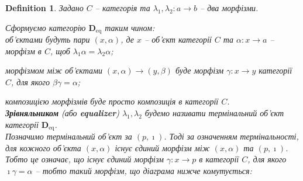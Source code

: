 \documentclass[a4paper, 10pt]{article}
\theoremstyle{theoremdd}
\newtheorem{definition}[theorem]{Definition}
\begin{document}
\begin{definition}
Задано $C$ -- категорія та $\lambda_1,\lambda_2 \colon a \to b$ -- два морфізми.
\begin{figure}[H]
\centering
{}
\end{figure}
\noindent
Сформуємо категорію $\textbf{D}_{\text{eq}}$ таким чином:\\
об'єктами будуть пари $(x,\alpha)$, де $x$ -- об'єкт категорії $C$ та $\alpha \colon x \to a$ -- морфізм в $C$, щоб $\lambda_1 \alpha = \lambda_2 \alpha$;
\begin{figure}[H]
\centering
{}
\end{figure}
\noindent
морфізмом між об'єктами $(x,\alpha) \to (y,\beta)$ буде морфізм $\gamma \colon x \to y$ категорії $C$, для якого $\beta \gamma = \alpha$;
\begin{figure}[H]
\centering
{}
\end{figure}
\noindent
композицією морфізмів буде просто композиція в категорії $C$.\\
\textbf{Зрівняльником} (або \textbf{equalizer}) $\lambda_1,\lambda_2$ будемо називати термінальний об'єкт категорії $\textbf{D}_{\text{eq}}$.
\bigskip \\
Позначимо термінальний об'єкт за $(p,\imath)$. Тоді за означенням термінальності, для кожного об'єкта $(x,\alpha)$ існує єдиний морфізм між $(x,\alpha)$ та $(p,\imath)$. Тобто це означає, що існує єдиний морфізм $\gamma \colon x \to p$ в категорії $C$, для якого $\imath \gamma = \alpha$ -- тобто такий морфізм, що діаграма нижче комутується:
\begin{figure}[H]
\centering
{}
\end{figure}
\end{definition}
\end{document}
